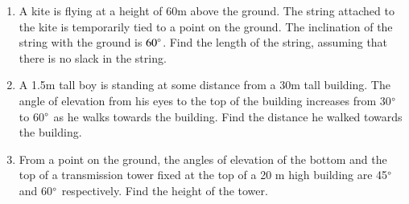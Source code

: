 \begin{enumerate}[label=\arabic*.,ref=\thesubsection.\theenumi]
%
\item A kite is flying at a height of 60m above the ground.  The string attached to the kite is temporarily tied to a point on the ground.  The inclination of the string with the ground is $60\degree$.  Find the length of the string, assuming that there is no slack in the string.
%
\item A 1.5m tall boy is standing at some distance from a 30m tall building.  The angle of elevation from his eyes to the top of the building increases from 30$\degree$
 to 60$\degree $ as he walks towards the building.  Find the distance he walked towards the building.

\item From a point on the ground, the angles of elevation of the bottom and the top of a transmission tower fixed at the top of a 20 m high building are 45$\degree$ and 60$\degree$ respectively. Find the height of the tower.


\end{enumerate}
